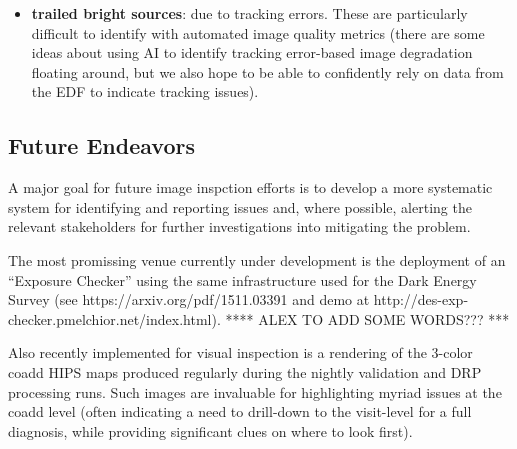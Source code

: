 \begin{itemize}
\item \textbf{trailed bright sources}: due to tracking errors.  These are particularly
  difficult to identify with automated image quality metrics (there are some ideas
  about using AI to identify tracking error-based image degradation floating around,
  but we also hope to be able to confidently rely on data from the EDF to indicate
  tracking issues).

\end{itemize}

\subsection{Future Endeavors}

A major goal for future image inspction efforts is to develop a more systematic
system for identifying and reporting issues and, where possible, alerting the
relevant stakeholders for further investigations into mitigating the problem.

The most promissing venue currently under development is the deployment of an
``Exposure Checker'' using the same infrastructure used for the Dark Energy Survey
(see https://arxiv.org/pdf/1511.03391 and demo at
http://des-exp-checker.pmelchior.net/index.html).
**** ALEX TO ADD SOME WORDS??? ***

Also recently implemented for visual inspection is a rendering of the 3-color coadd
HIPS maps produced regularly during the nightly validation and DRP processing runs.
Such images are invaluable for highlighting myriad issues at the coadd level (often
indicating a need to drill-down to the visit-level for a full diagnosis, while
providing significant clues on where to look first).
